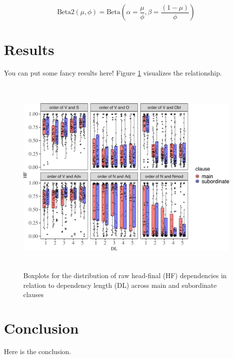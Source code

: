 \documentclass[10pt,a4paper,]{article}
\begin{document}
\begin{equation*}
\text{Beta2} \left(\mu, \phi \right) = \text{Beta} \left(\alpha = \frac{\mu}{\phi}, \beta = \frac{\left(1 - \mu \right)}{\phi} \right)
\end{equation*}

\section{Results}\label{results}

You can put some fancy results here! Figure \ref{fig-raw-dist}
visualizes the relationship.

\captionsetup{margin=1cm}
\begin{figure}[htpb]
\centering
\includegraphics[width=14cm, height=10cm]{figures/relationship between DL and HF-1.pdf}
\caption{Boxplots for the distribution of raw head-final (HF) dependencies in relation to dependency length (DL) across main and subordinate clauses} 
\label{fig-raw-dist}
\end{figure}

\section{Conclusion}\label{conclusion}

Here is the conclusion. \setlength{\parskip}{0pt}

\raggedright
{}

\printbibliography[title=References]

\end{document}
